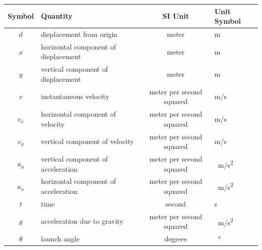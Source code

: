 \documentclass[main-physics.tex]{subfiles}
\begin{document}
\begin{center}
    \begin{tabular}{cl|cl}
    \hline
    \textbf{Symbol} & \textbf{Quantity} & \textbf{SI Unit} & \textbf{Unit Symbol}  \\
    \hline\hline
        $d$ & displacement from origin & meter & m\\
        $x$ & horizontal component of displacement & meter & m\\
        $y$ & vertical component of displacement & meter & m\\
        $v$ & instantaneous velocity & meter per second squared & m/s\\
        $v_x$ & horizontal component of velocity & meter per second squared & m/s\\
        $v_y$ & vertical component of velocity & meter per second squared & m/s\\
        $a_y$ & vertical component of acceleration & meter per second squared & \SI{}{m/s^2}\\ 
        $a_x$ & horizontal component of acceleration & meter per second squared & \SI{}{m/s^2}\\
        $t$ & time & second & s\\
        $g$ & acceleration due to gravity & meter per second squared & \SI{}{m/s^2}\\
        $\theta$ & launch angle & degrees & \SI{}{\degree}\\
    \hline
    \end{tabular}
\captionsetup{type=table,margin=1in,font=scriptsize}
\label{zvgNdH}
\end{center}
\end{document}
